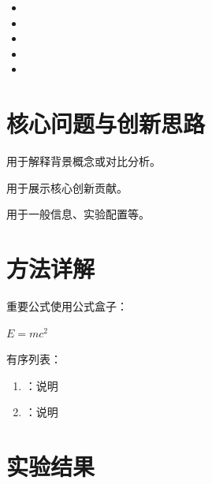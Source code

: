 \documentclass{ModernColorful}
\begin{document}
\begin{itemize}
  \item {}
  \item {}
  \item {}
  \item {}
  \item {}
\end{itemize}

\section{核心问题与创新思路}

\begin{conceptbox}[概念盒子]
  用于解释背景概念或对比分析。
\end{conceptbox}

\begin{innovationbox}[创新点]
  用于展示核心创新贡献。
\end{innovationbox}

\begin{infobox}[信息盒子]
  \centering
  用于一般信息、实验配置等。
\end{infobox}

\section{方法详解}

重要公式使用公式盒子：

\begin{equationbox}
  \centering
  $E = mc^2$
\end{equationbox}

有序列表：
\begin{enumerate}
  \item {}：说明
  \item {}：说明
\end{enumerate}

\section{实验结果}
\end{document}
